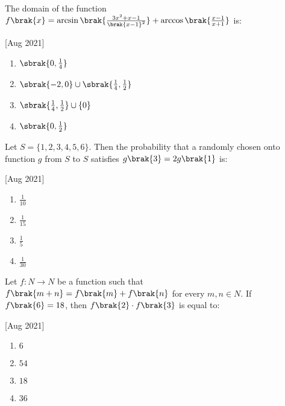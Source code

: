     \item The domain of the function $f\brak{x}=\arcsin\brak{\frac{3x^2+x-1}{\brak{x-1}^2}}+\arccos\brak{\frac{x-1}{x+1}}$ is:
    
    \hfill[Aug 2021]

        \begin{multicols}{4}
            \begin{enumerate}
                \item $\sbrak{0, \frac{1}{4}}$
                \item $\sbrak{-2,0}\cup\sbrak{\frac{1}{4}, \frac{1}{2}}$
                \item $\sbrak{\frac{1}{4}, \frac{1}{2}}\cup\{0\}$
                \item $\sbrak{0, \frac{1}{2}}$
            \end{enumerate}
        \end{multicols}

    \item Let $S=\{1,2,3,4,5,6\}$. Then the probability that a randomly chosen onto function $g$ from $S$ to $S$ satisfies $g\brak{3}=2g\brak{1}$ is:
    
    \hfill[Aug 2021]

		\begin{multicols}{4}
			\begin{enumerate}
				\item $\frac{1}{10}$
				\item $\frac{1}{15}$
				\item $\frac{1}{5}$
				\item $\frac{1}{30}$
			\end{enumerate}
		\end{multicols}

    \item Let $f:N\to N$ be a function such that $f\brak{m+n}=f\brak{m}+f\brak{n}$ for every $m,n\in N$. If $f\brak{6}=18$, then $f\brak{2}\cdot f\brak{3}$ is equal to:
    
    \hfill[Aug 2021]

		\begin{multicols}{4}
			\begin{enumerate}
				\item $6$
				\item $54$
				\item $18$
				\item $36$
			\end{enumerate}
		\end{multicols}
  
